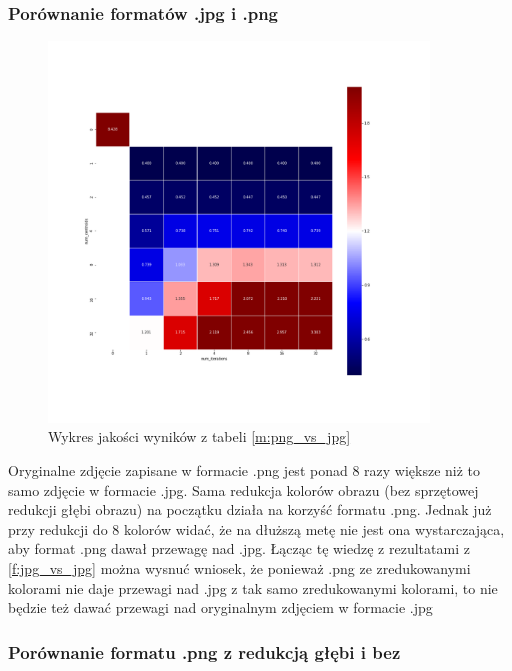 \subsubsection{Porównanie formatów .jpg i .png}
\label{f:png_vs_jpg}

\begin{figure}[H]
	\includegraphics[width=0.9\textwidth]{photos/plots/png_vs_jpg}
    \caption{Wykres jakości wyników z tabeli \ref{m:png_vs_jpg}}
\end{figure}

Oryginalne zdjęcie zapisane w formacie .png jest ponad 8 razy większe niż to samo zdjęcie w formacie .jpg.
Sama redukcja kolorów obrazu (bez sprzętowej redukcji głębi obrazu) na początku działa na korzyść formatu .png. Jednak już przy redukcji do 8 kolorów widać, że na dłuższą metę nie jest ona wystarczająca, aby format .png dawał przewagę nad .jpg. Łącząc tę wiedzę z rezultatami z \ref{f:jpg_vs_jpg} można wysnuć wniosek, że ponieważ .png ze zredukowanymi kolorami nie daje przewagi nad .jpg z tak samo zredukowanymi kolorami, to nie będzie też dawać przewagi nad oryginalnym zdjęciem w formacie .jpg

\subsubsection{Porównanie formatu .png z redukcją głębi i bez}
\label{f:red_vs_png}

